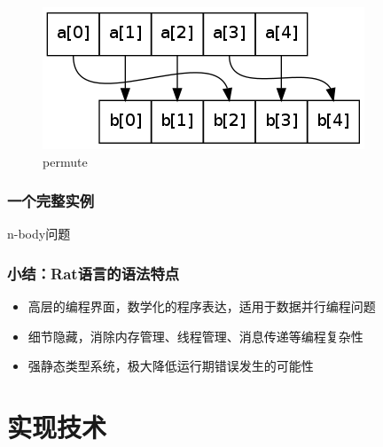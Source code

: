 \documentclass{beamer}
\begin{document}
\begin{frame}[t]
{\begin{figure}
      \caption{permute}
      \includegraphics[scale=0.4]{images/permute.png}
    \end{figure}
  }
\end{frame}

\begin{frame}
  \frametitle{一个完整实例}
  n-body问题
  
\end{frame}

\begin{frame}
  \frametitle{小结：Rat语言的语法特点}
  \begin{itemize}
    \item 高层的编程界面，数学化的程序表达，适用于数据并行编程问题
    \item 细节隐藏，消除内存管理、线程管理、消息传递等编程复杂性
    \item 强静态类型系统，极大降低运行期错误发生的可能性
  \end{itemize}
\end{frame}

\section{实现技术}
\frame{\tableofcontents[currentsection]}
\end{document}
